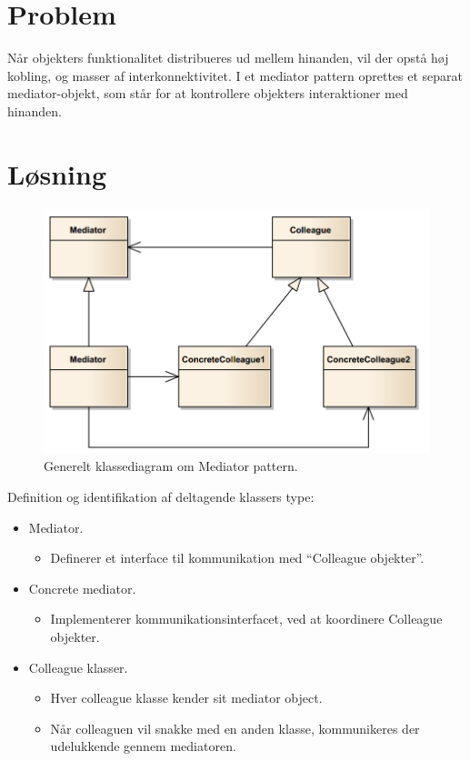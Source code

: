 \section{Problem}
Når objekters funktionalitet distribueres ud mellem hinanden, vil der opstå høj kobling, og masser af interkonnektivitet.  I et mediator pattern oprettes et separat mediator-objekt, som står for at kontrollere objekters interaktioner med hinanden. 

\section{Løsning}

\begin{figure}[h]
	\centering
	\includegraphics[width=\linewidth]{figs/concrete}
	\caption{Generelt klassediagram om Mediator pattern.}
	\label{fig:concrete}
\end{figure}

Definition og identifikation af deltagende klassers type:

\begin{itemize}
	\item Mediator.
	\begin{itemize}
		\item 	Definerer et interface til kommunikation med “Colleague objekter”.
	\end{itemize}
	\item Concrete mediator.
	\begin{itemize}
		\item 	Implementerer kommunikationsinterfacet, ved at koordinere Colleague objekter.
	\end{itemize}
	\item Colleague klasser.
	\begin{itemize}
		\item Hver colleague klasse kender sit mediator object.
		\item Når colleaguen vil snakke med en anden klasse, kommunikeres der udelukkende gennem mediatoren.
	\end{itemize}
\end{itemize}


